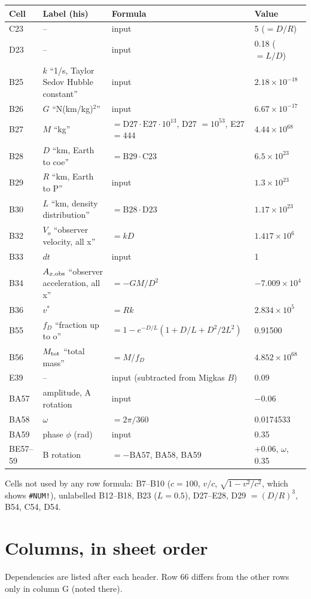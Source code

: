 \documentclass[10pt]{article}
\begin{document}
\begin{table}[H]\centering\small
\begin{tabular}{@{}llll@{}}\toprule
Cell & Label (his) & Formula & Value \\\midrule
C23 & -- & input & 5 \quad($=D/R$)\\
D23 & -- & input & 0.18 \quad($=L/D$)\\
B25 & $k$ ``1/s, Taylor Sedov Hubble constant'' & input & $2.18\times10^{-18}$\\
B26 & $G$ ``N(km/kg)$^2$'' & input & $6.67\times10^{-17}$\\
B27 & $M$ ``kg'' & $=\mathrm{D27}\cdot\mathrm{E27}\cdot10^{13}$, D27 $=10^{53}$, E27 $=444$ & $4.44\times10^{68}$\\
B28 & $D$ ``km, Earth to coe'' & $=\mathrm{B29}\cdot\mathrm{C23}$ & $6.5\times10^{23}$\\
B29 & $R$ ``km, Earth to P'' & input & $1.3\times10^{23}$\\
B30 & $L$ ``km, density distribution'' & $=\mathrm{B28}\cdot\mathrm{D23}$ & $1.17\times10^{23}$\\
B32 & $V_o$ ``observer velocity, all x'' & $=kD$ & $1.417\times10^{6}$\\
B33 & $dt$ & input & 1\\
B34 & $A_{x,\rm obs}$ ``observer acceleration, all x'' & $=-GM/D^2$ & $-7.009\times10^{4}$\\
B36 & $v^*$ & $=Rk$ & $2.834\times10^{5}$\\
B55 & $f_D$ ``fraction up to o'' & $=1-e^{-D/L}(1+D/L+D^2/2L^2)$ & 0.91500\\
B56 & $M_{\rm tot}$ ``total mass'' & $=M/f_D$ & $4.852\times10^{68}$\\
E39 & -- & input (subtracted from Migkas $B$) & 0.09\\
BA57 & amplitude, A rotation & input & $-0.06$\\
BA58 & $\omega$ & $=2\pi/360$ & 0.0174533\\
BA59 & phase $\phi$ (rad) & input & 0.35\\
BE57--59 & B rotation & $=-\mathrm{BA57}$, BA58, BA59 & $+0.06$, $\omega$, 0.35\\\bottomrule
\end{tabular}\end{table}
Cells not used by any row formula: B7--B10 ($c=100$, $v/c$, $\sqrt{1-v^2/c^2}$, which shows \texttt{\#NUM!}),
unlabelled B12--B18, B23 ($L=0.5$), D27--E28, D29 $=(D/R)^3$, B54, C54, D54.

\section{Columns, in sheet order}
Dependencies are listed after each header. Row 66 differs from the other rows only in column G (noted there).
\end{document}
